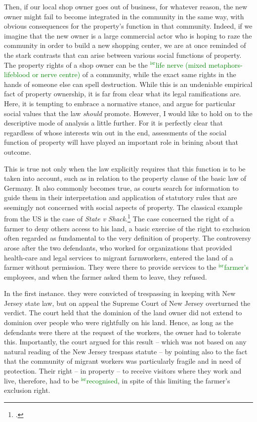 \documentclass[12pt,a4paper]{book} %
\newcommand{\isr}[1]{\textcolor{green}{$^{\textrm{isr}}${#1}}}
\begin{document}
Then, if our local shop owner goes out of business, for whatever reason, the new owner might fail to become integrated in the community in the same way, with obvious consequences for the property's function in that community. Indeed, if we imagine that the new owner is a large commercial actor who is hoping to raze the community in order to build a new shopping center, we are at once reminded of the stark contrasts that can arise between various social functions of property. The property rights of a shop owner can be the \isr{life nerve (mixed metaphors- lifeblood or nerve centre)} of a community, while the exact same rights in the hands of someone else can spell destruction. While this is an undeniable empirical fact of property ownership, it is far from clear what its legal ramifications are. Here, it is tempting to embrace a normative stance, and argue for particular social values that the law {\it should} promote. However, I would like to hold on to the descriptive mode of analysis a little further. For it is perfectly clear that regardless of whose interests win out in the end, assessments of the social function of property will have played an important role in brining about that outcome.

This is true not only when the law explicitly requires that this function is to be taken into account, such as in relation to the property clause of the basic law of Germany. It also commonly becomes true, as courts search for information to guide them in their interpretation and application of statutory rules that are seemingly not concerned with social aspects of property. The classical example from the US is the case of {\it State v Shack}.\footcite{shack71} The case concerned the right of a farmer to deny others access to his land, a basic exercise of the right to exclusion often regarded as fundamental to the very definition of property. The controversy arose after the two defendants, who worked for organizations that provided health-care and legal services to migrant farmworkers, entered the land of a farmer without permission. They were there to provide services to the \isr{farmer's} employees, and when the farmer asked them to leave, they refused.

In the first instance. they were convicted of trespassing in keeping with New Jersey state law, but on appeal the Supreme Court of New Jersey overturned the verdict. The court held that the dominion of the land owner did not extend to dominion over people who were rightfully on his land. Hence, as long as the defendants were there at the request of the workers, the owner had to tolerate this. Importantly, the court argued for this result -- which was not based on any natural reading of the New Jersey trespass statute -- by pointing also to the fact that the community of migrant workers was particularly fragile and in need of protection. Their right -- in property -- to receive visitors where they work and live, therefore, had to be \isr{recognised}, in spite of this limiting the farmer's exclusion right.
\end{document}
